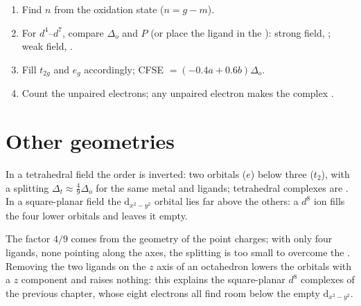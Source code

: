 \begin{method}\label{met:b2:ligand-field:spin-state}
\begin{enumerate}
  \item Find $n$ from the oxidation state ($n = g - m$).
  \item For $d^4$--$d^7$, compare $\Delta_o$ and $P$ (or place the ligand in the
        ): strong field, ; weak field, .
  \item Fill $t_{2g}$ and $e_g$ accordingly; CFSE $= (-0.4a + 0.6b)\Delta_o$.
  \item Count the unpaired electrons; any unpaired electron makes the complex
        .
\end{enumerate}
\end{method}

\section{Other geometries}

\begin{proposition}\label{prop:b2:ligand-field:tetrahedral}
In a tetrahedral field the order is inverted: two orbitals ($e$) below three ($t_2$),
with a splitting $\Delta_t \approx \frac49\Delta_o$ for the same metal and ligands; tetrahedral
complexes are . In a square-planar field the $\mathrm d_{x^2-y^2}$ orbital lies far
above the others: a $d^8$ ion fills the four lower orbitals and leaves it empty.
\end{proposition}

\admitted

The factor $4/9$ comes from the geometry of the point charges; with only four ligands,
none pointing along the axes, the splitting is too small to overcome the . Removing the two ligands on the $z$ axis of an octahedron lowers the orbitals with
a $z$ component and raises nothing: this explains the square-planar $d^8$ complexes of
the previous chapter, whose eight electrons all find room below the empty
$\mathrm d_{x^2-y^2}$.

